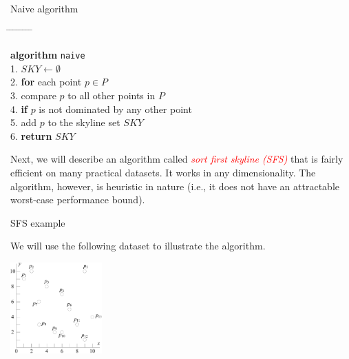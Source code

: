 \documentclass{beamer}
\newcommand{\red}[1]{\textcolor{red}{#1}}
\def\tabpos{\hspace{4mm} \= \hspace{4mm} \= \hspace{4mm} \= \hspace{4mm} \= \hspace{4mm} \= \hspace{4mm} \= \hspace{4mm} \= \hspace{4mm} \= \hspace{4mm} \kill}
\begin{document}
    \begin{frame}{Naive algorithm}\label{fra:naive}
    \begin{small}
        \begin{tabbing}
            \tabpos

            {\bf algorithm} \texttt{naive} \\
			1.\>	$SKY \leftarrow \emptyset$ \\
            2.\>    {\bf for} each point $p \in P$ \\
            3.\>\>      compare $p$ to all other points in $P$ \\
			4.\>\>		{\bf if} $p$ is not dominated by any other point \\
			5.\>\>\>		add $p$ to the skyline set $SKY$ \\
            6.\>    {\bf return} $SKY$
        \end{tabbing}
    \end{small}
    \end{frame}
    \begin{frame}
    \begin{small}
        Next, we will describe an algorithm called \red{\em sort first skyline (SFS)} that is fairly efficient on many practical datasets. It works in any dimensionality. The algorithm, however, is heuristic in nature (i.e., it does not have an attractable worst-case performance bound).
    \end{small}
    \end{frame}
    \begin{frame}{SFS example}
    \begin{small}
        We will use the following dataset to illustrate the algorithm.
        \begin{center}
            \includegraphics[height=35mm]{./artwork/data.pdf}
        \end{center}
    \end{small}
    \end{frame}
\end{document}

